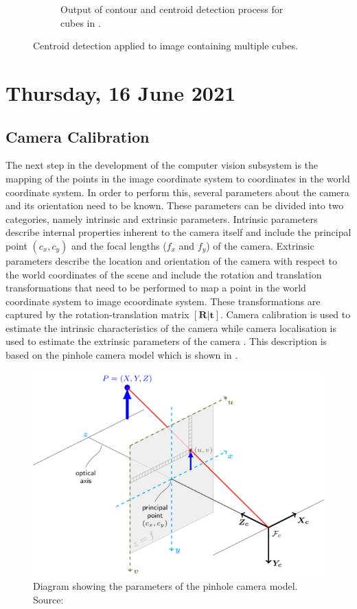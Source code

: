 \begin{figure}[H]
\begin{subfigure}[b]{0.45\textwidth}
         \caption{Output of contour and centroid detection process for cubes in .}
         \label{fig:multiple-cube-centroids}
    \end{subfigure}
    \captionsetup{singlelinecheck = false, justification=justified}
    \caption{Centroid detection applied to image containing multiple cubes.}
    \label{fig:multiple-cube-detection}
\end{figure}

\pendsign

\section[2021/06/16]{Thursday, 16 June 2021}

\subsection{Camera Calibration}

The next step in the development of the computer vision subsystem is the mapping of the points in the image coordinate system to coordinates in the world coordinate system. In order to perform this, several parameters about the camera and its orientation need to be known. These parameters can be divided into two categories, namely intrinsic and extrinsic parameters. Intrinsic parameters describe internal properties inherent to the camera itself and include the principal point $(c_x,c_y)$ and the focal lengths ($f_x$ and $f_y$) of the camera. Extrinsic parameters describe the location and orientation of the camera with respect to the world coordinates of the scene and include the rotation and translation transformations that need to be performed to map a point in the world coordinate system to image ecoordinate system. These transformations are captured by the rotation-translation matrix $[\textbf{R}|\textbf{t}]$. Camera calibration is used to estimate the intrinsic characteristics of the camera while camera localisation is used to estimate the extrinsic parameters of the camera \cite{Szeliski2010}. This description is based on the pinhole camera model which is shown in .

\begin{figure}[!ht]
    \centering
    \includegraphics[width=0.7\linewidth]{figures/202106/pinhole-camera-model.png}
    \caption{Diagram showing the parameters of the pinhole camera model. Source: \cite{OpenCVCameraCalibration}}
    \label{fig:pinhole-camera-model}
\end{figure}


